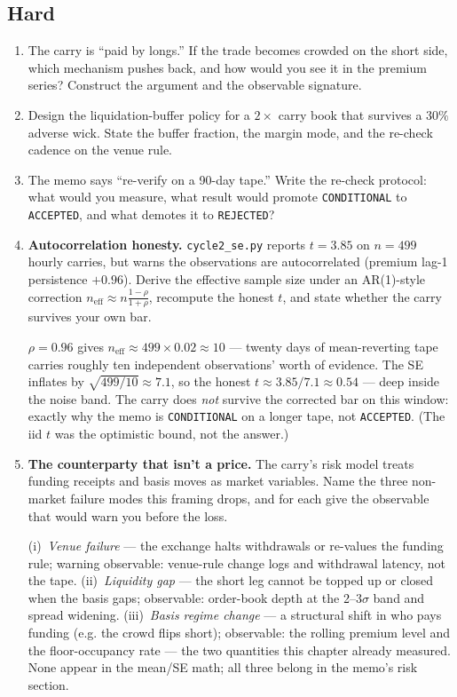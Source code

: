 \subsection*{Hard}
\begin{enumerate}
\item The carry is ``paid by longs.'' If the trade becomes
crowded on the short side, which mechanism pushes back, and how
would you see it in the premium series? Construct the argument
and the observable signature.
\item Design the liquidation-buffer policy for a $2\times$
carry book that survives a $30\%$ adverse wick. State the
buffer fraction, the margin mode, and the re-check cadence on
the venue rule.
\item The memo says ``re-verify on a 90-day tape.'' Write the
re-check protocol: what would you measure, what result would
promote \texttt{CONDITIONAL} to \texttt{ACCEPTED}, and what
demotes it to \texttt{REJECTED}?
\item \textbf{Autocorrelation honesty.} \texttt{cycle2\_se.py}
reports $t=3.85$ on $n=499$ hourly carries, but warns the
observations are autocorrelated (premium lag-1 persistence
$+0.96$). Derive the effective sample size under an AR(1)-style
correction $n_{\mathrm{eff}}\approx n\frac{1-\rho}{1+\rho}$,
recompute the honest $t$, and state whether the carry survives
your own bar.
\begin{solution}
$\rho=0.96$ gives $n_{\mathrm{eff}}\approx499\times0.02\approx10$
--- twenty days of mean-reverting tape carries roughly ten
independent observations' worth of evidence. The SE inflates by
$\sqrt{499/10}\approx7.1$, so the honest $t\approx3.85/7.1\approx0.54$
--- deep inside the noise band. The carry does \emph{not} survive
the corrected bar on this window: exactly why the memo is
\texttt{CONDITIONAL} on a longer tape, not \texttt{ACCEPTED}.
(The iid $t$ was the optimistic bound, not the answer.)
\end{solution}
\item \textbf{The counterparty that isn't a price.} The carry's
risk model treats funding receipts and basis moves as market
variables. Name the three non-market failure modes this framing
drops, and for each give the observable that would warn you before
the loss.
\begin{solution}
(i)~\emph{Venue failure} --- the exchange halts withdrawals or
re-values the funding rule; warning observable: venue-rule change
logs and withdrawal latency, not the tape. (ii)~\emph{Liquidity
gap} --- the short leg cannot be topped up or closed when the
basis gaps; observable: order-book depth at the 2--3$\sigma$ band
and spread widening. (iii)~\emph{Basis regime change} --- a
structural shift in who pays funding (e.g. the crowd flips short);
observable: the rolling premium level and the floor-occupancy rate
--- the two quantities this chapter already measured. None appear
in the mean/SE math; all three belong in the memo's risk section.
\end{solution}
\end{enumerate}
